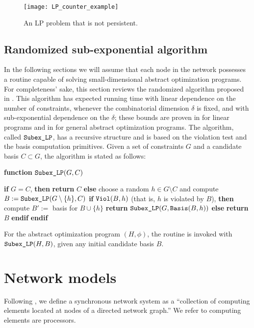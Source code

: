 \documentclass[onecolumn,journal,letterpaper]{IEEEtran}
\newcommand{\union}{\cup}
\newcommand{\ViolTest}[2]{\textup{\texttt{Viol}}(#1, #2)}
\newcommand{\Basis}[2]{\textup{\texttt{Basis}}(#1, #2)}
\newcommand{\subexLP}{\textup{\texttt{SUBEX\_lp}}}
\renewcommand{\subexLP}{\textup{\texttt{Subex\_LP}}}
\begin{document}
\begin{figure}[htbp]
  \centering
\texttt{[image: LP\_counter\_example]}
  \caption{An LP problem that is not persistent.}
  \label{fig:LP_counter_example}
\end{figure}


\subsection{Randomized sub-exponential algorithm}
In the following sections we will assume that each node in the network
possesses a routine capable of solving small-dimensional abstract
optimization programs. For completeness' sake, this section reviews the
randomized algorithm proposed in \cite{JM-MS-EW:96}. This algorithm has
expected running time with linear dependence on the number of constraints,
whenever the combinatorial dimension $\delta$ is fixed, and with
sub-exponential dependence on the $\delta$; these bounds are proven in
\cite{JM-MS-EW:96} for linear programs and in \cite{BG-EW:96} for general
abstract optimization programs.
The algorithm, called $\subexLP$, has a recursive structure and is based on
the violation test and the basis computation primitives.  Given a set of
constraints $G$ and a candidate basis $C \subset G$, the algorithm is
stated as follows:
\begin{center}
\begin{minipage}[c]{.9\textwidth}
\textbf{function} $\subexLP(G, C)$
\begin{algorithmic}[1]
\STATE \textbf{if} $G = C$, \textbf{then} \textbf{return} $C$
\STATE \textbf{else}
\STATE \quad choose a random $h\in G \setminus C$ and
compute $B := \subexLP ( G\setminus\{h\}, C)$
\STATE \quad \textbf{if} {$\ViolTest{B}{h}$  (that is, $h$ is violated by
  $B$),} \textbf{then}
\STATE \quad \quad compute $B' := $ basis for $B\union\{h\}$
\STATE \quad \quad \textbf{return} $\subexLP(G,\Basis{B}{h})$
\STATE \quad \textbf{else} \textbf{return} $B$
\STATE \quad \textbf{endif}
\STATE \textbf{endif}
\end{algorithmic}
\end{minipage}
\end{center}

\noindent For the abstract optimization program $(H,\phi)$, the routine is
invoked with $\subexLP(H,B)$, given any initial candidate basis $B$.



\section{Network models}
\label{sec:network-modeling}
Following \cite{NAL:97}, we define a synchronous network system as a
``collection of computing elements located at nodes of a directed network
graph.''  We refer to computing elements are processors.
\end{document}
